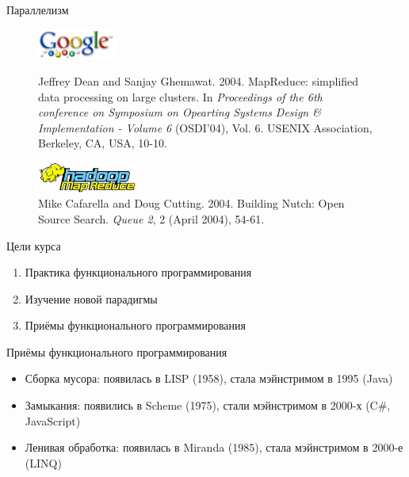 \documentclass{beamer}
\begin{document}
\begin{frame}{Параллелизм}
  \begin{figure}[h]
    \begin{minipage}[h]{1\linewidth}
      \begin{center}
        \includegraphics[height=10mm]{lecture0/GoogleLabs.eps}
        \caption{Jeffrey Dean and Sanjay Ghemawat. 2004. MapReduce: simplified
          data processing on large clusters. In 
          \emph{Proceedings of the 6th conference on Symposium on Opearting
            Systems Design \& Implementation - Volume 6} (OSDI'04), Vol. 6.
          USENIX Association, Berkeley, CA, USA, 10-10.}
      \end{center}
    \end{minipage}
    \begin{minipage}[h]{1\linewidth}
      \begin{center}
        \includegraphics[height=10mm]{lecture0/HadoopMR.eps}
        \caption{Mike Cafarella and Doug Cutting. 2004. Building Nutch:
          Open Source Search. \emph{Queue 2}, 2 (April 2004), 54-61.}        
      \end{center}
    \end{minipage}
  \end{figure}
\end{frame}

\begin{frame}{Цели курса}
  \begin{enumerate}
  \item Практика функционального программирования
  \item Изучение новой парадигмы
  \item Приёмы функционального программирования
  \end{enumerate}
\end{frame}

\begin{frame}{Приёмы функционального программирования}
  \begin{itemize}
  \item Сборка мусора: появилась в LISP (1958), стала мэйнстримом в 1995
    (Java)\pause
  \item Замыкания: появились в Scheme (1975), стали мэйнстримом в 2000-х
    (C\#, JavaScript)\pause
  \item Ленивая обработка: появилась в Miranda (1985), стала мэйнстримом
    в 2000-е (LINQ)
  \end{itemize}
\end{frame}
\end{document}
